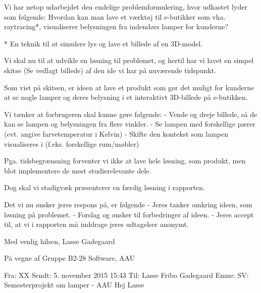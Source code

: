\documentclass[oneside,a4paper,titlepage]{article}
\begin{document}
Vi har netop udarbejdet den endelige problemformulering, hvor udkastet lyder som følgende:
Hvordan kan man lave et værktøj til e-butikker som vha. raytracing*, visualiserer belysningen fra indendørs lamper for kunderne? 

* En teknik til at simulere lys og lave et billede af en 3D-model. 

Vi skal nu til at udvikle en løsning til problemet, og hertil har vi lavet en simpel skitse (Se vedlagt billede) af den ide vi har på nuværende tidspunkt. 
 
Som vist på skitsen, er ideen at lave et produkt som gør det muligt for kunderne at se nogle lamper og deres belysning i et interaktivt 3D-billede på e-butikken. 

Vi tænker at forbrugeren skal kunne gøre følgende: \newline
 - Vende og dreje billede, så de kan se lampen og belysningen fra flere vinkler. \newline
 - Se lampen med forskellige pærer (evt. angive farvetemperatur i Kelvin) \newline
 - Skifte den kontekst som lampen visualiseres i (f.eks. forskellige rum/møbler)

Pga. tidsbegrænsning forventer vi ikke at lave hele løsning, som produkt, men blot implementere de mest studierelevante dele. 

Dog skal vi stadigvæk præsenterer en færdig løsning i rapporten. 

Det vi nu ønsker jeres respons på, er følgende
 - Jeres tanker omkring ideen, som løsning på problemet.\newline
 - Forslag og ønsker til forbedringer af ideen. \newline
 - Jeres accept til, at vi i rapporten må inddrage jeres udtagelser anonymt.

Med venlig hilsen,\newline
Lasse Gadegaard
 
På vegne af \newline
Gruppe B2-28\newline
Software, AAU
 
\noindent\makebox[\linewidth]{\rule{\paperwidth}{0.4pt}}

Fra: XX \newline
Sendt: 5. november 2015 15:43\newline
Til: Lasse Fribo Gadegaard\newline
Emne: SV: Semesterprojekt om lamper - AAU\newline
Hej Lasse
\end{document}
